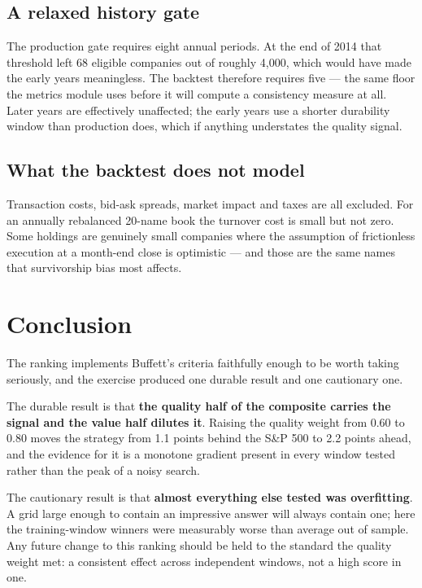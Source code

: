 \documentclass[11pt,a4paper]{article}
\begin{document}
\subsection{A relaxed history gate}

The production gate requires eight annual periods. At the end of 2014 that
threshold left 68 eligible companies out of roughly 4,000, which would have
made the early years meaningless. The backtest therefore requires five --- the
same floor the metrics module uses before it will compute a consistency measure
at all. Later years are effectively unaffected; the early years use a shorter
durability window than production does, which if anything understates the
quality signal.

\subsection{What the backtest does not model}

Transaction costs, bid-ask spreads, market impact and taxes are all excluded.
For an annually rebalanced 20-name book the turnover cost is small but not
zero. Some holdings are genuinely small companies where the assumption of
frictionless execution at a month-end close is optimistic --- and those are the
same names that survivorship bias most affects.

\section{Conclusion}

The ranking implements Buffett's criteria faithfully enough to be worth taking
seriously, and the exercise produced one durable result and one cautionary one.

The durable result is that \textbf{the quality half of the composite carries
the signal and the value half dilutes it}. Raising the quality weight from 0.60
to 0.80 moves the strategy from 1.1 points behind the S\&P 500 to 2.2 points
ahead, and the evidence for it is a monotone gradient present in every window
tested rather than the peak of a noisy search.

The cautionary result is that \textbf{almost everything else tested was
overfitting}. A grid large enough to contain an impressive answer will always
contain one; here the training-window winners were measurably worse than
average out of sample. Any future change to this ranking should be held to the
standard the quality weight met: a consistent effect across independent
windows, not a high score in one.
\end{document}
